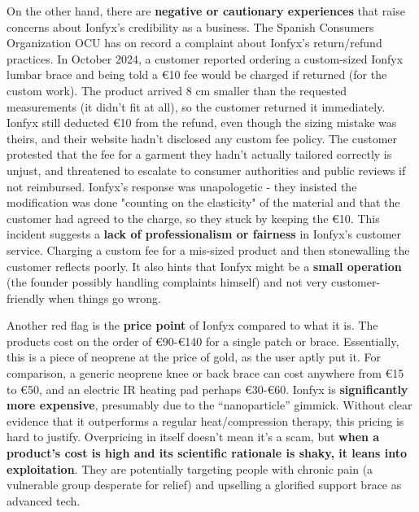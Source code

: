 \documentclass{article}
\begin{document}
On the other hand, there are \textbf{negative or cautionary experiences} that raise concerns about Ionfyx's credibility as a business. The Spanish Consumers Organization OCU has on record a complaint about Ionfyx's return/refund practices. In October 2024, a customer reported ordering a custom-sized Ionfyx lumbar brace and being told a €10 fee would be charged if returned (for the custom work). The product arrived 8 cm smaller than the requested measurements (it didn't fit at all), so the customer returned it immediately. Ionfyx still deducted €10 from the refund, even though the sizing mistake was theirs, and their website hadn't disclosed any custom fee policy. The customer protested that the fee for a garment they hadn't actually tailored correctly is unjust, and threatened to escalate to consumer authorities and public reviews if not reimbursed. Ionfyx's response was unapologetic - they insisted the modification was done "counting on the elasticity" of the material and that the customer had agreed to the charge, so they stuck by keeping the €10. This incident suggests a \textbf{lack of professionalism or fairness} in Ionfyx's customer service. Charging a custom fee for a mis-sized product and then stonewalling the customer reflects poorly. It also hints that Ionfyx might be a \textbf{small operation} (the founder possibly handling complaints himself) and not very customer-friendly when things go wrong.

Another red flag is the \textbf{price point} of Ionfyx compared to what it is. The products cost on the order of €90-€140 for a single patch or brace. Essentially, this is a piece of neoprene at the price of gold, as the user aptly put it. For comparison, a generic neoprene knee or back brace can cost anywhere from €15 to €50, and an electric IR heating pad perhaps €30-€60. Ionfyx is \textbf{significantly more expensive}, presumably due to the “nanoparticle” gimmick. Without clear evidence that it outperforms a regular heat/compression therapy, this pricing is hard to justify. Overpricing in itself doesn't mean it's a scam, but \textbf{when a product's cost is high and its scientific rationale is shaky, it leans into exploitation}. They are potentially targeting people with chronic pain (a vulnerable group desperate for relief) and upselling a glorified support brace as advanced tech.
\end{document}
